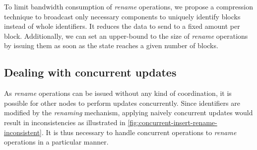 \documentclass[sigplan,10pt,authorversion]{acmart}
\begin{document}
To limit bandwidth consumption of \emph{rename} operations, we propose a compression technique to broadcast only necessary components to uniquely identify blocks instead of whole identifiers.
It reduces the data to send to a fixed amount per block.
Additionally, we can set an upper-bound to the size of \emph{rename} operations by issuing them as soon as the state reaches a given number of blocks.

\subsection{Dealing with concurrent updates}

\label{sec:dealing-with-concurrent-updates}

As \emph{rename} operations can be issued without any kind of coordination, it is possible for other nodes to perform updates concurrently.
Since identifiers are modified by the \emph{renaming} mechanism, applying naively concurrent updates would result in inconsistencies as illustrated in \autoref{fig:concurrent-insert-rename-inconsistent}.
It is thus necessary to handle concurrent operations to \emph{rename} operations in a particular manner.
\end{document}
